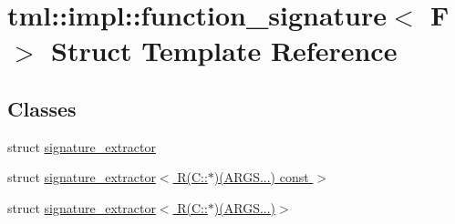 \hypertarget{structtml_1_1impl_1_1function__signature}{\section{tml\+:\+:impl\+:\+:function\+\_\+signature$<$ F $>$ Struct Template Reference}
\label{structtml_1_1impl_1_1function__signature}
}
\subsection*{Classes}
\begin{DoxyCompactItemize}
\item 
struct \hyperlink{structtml_1_1impl_1_1function__signature_1_1signature__extractor}{signature\+\_\+extractor}
\item 
struct \hyperlink{structtml_1_1impl_1_1function__signature_1_1signature__extractor_3_01R_07C_1_1_5_08_07ARGS_8_8_8_08_01const_01_01_4}{signature\+\_\+extractor$<$ R(\+C\+::$\ast$)(\+A\+R\+G\+S...) const  $>$}
\item 
struct \hyperlink{structtml_1_1impl_1_1function__signature_1_1signature__extractor_3_01R_07C_1_1_5_08_07ARGS_8_8_8_08_4}{signature\+\_\+extractor$<$ R(\+C\+::$\ast$)(\+A\+R\+G\+S...)$>$}
\end{DoxyCompactItemize}
